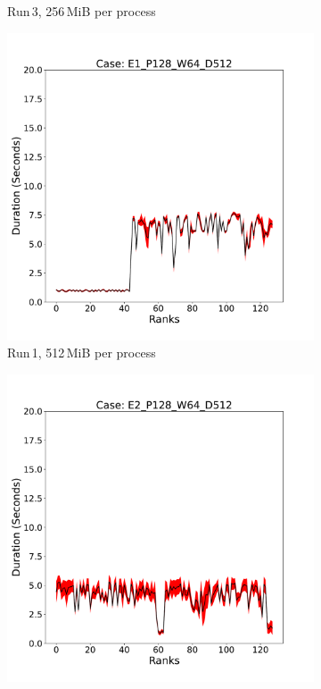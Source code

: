 \begin{figure}[h!]
\begin{subfigure}[b]{0.3\textwidth}
         \caption{Run\,3, 256\,MiB per process}
         \label{fig:E3_256_d2}
     \end{subfigure}
     \vfill
          \begin{subfigure}[b]{0.3\textwidth}
         \centering
         \includegraphics[width=\textwidth, height=\textwidth]{figures/deisa2__E1_P128_W64_D512.pdf}
         \caption{Run\,1, 512\,MiB per process}
         \label{fig:E1_512_d2}
     \end{subfigure}
     \hfill
     \begin{subfigure}[b]{0.3\textwidth}
         \centering
         \includegraphics[width=\textwidth, height=\textwidth]{figures/deisa2__E2_P128_W64_D512.pdf}

\end{subfigure}
\end{figure}

